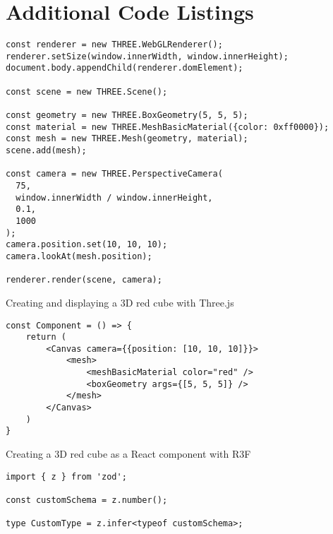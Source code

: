 \chapter{Additional Code Listings} \label{appendix-b}

\begin{listing}
\begin{verbatim}
const renderer = new THREE.WebGLRenderer();
renderer.setSize(window.innerWidth, window.innerHeight);
document.body.appendChild(renderer.domElement);

const scene = new THREE.Scene();

const geometry = new THREE.BoxGeometry(5, 5, 5);
const material = new THREE.MeshBasicMaterial({color: 0xff0000});
const mesh = new THREE.Mesh(geometry, material);
scene.add(mesh);

const camera = new THREE.PerspectiveCamera(
  75,
  window.innerWidth / window.innerHeight,
  0.1,
  1000
);
camera.position.set(10, 10, 10);
camera.lookAt(mesh.position);

renderer.render(scene, camera);
\end{verbatim}
\caption{Creating and displaying a 3D red cube with Three.js}
\label{listing:threejs}
\end{listing}

\begin{listing}
\begin{verbatim}
const Component = () => {
    return (
        <Canvas camera={{position: [10, 10, 10]}}>
            <mesh>
                <meshBasicMaterial color="red" />
                <boxGeometry args={[5, 5, 5]} />
            </mesh>
        </Canvas>
    )
}
\end{verbatim}
\caption{Creating a 3D red cube as a React component with R3F}
\label{lisiting:r3f}
\end{listing}

\begin{listing}
\begin{verbatim}
import { z } from 'zod';

const customSchema = z.number();

type CustomType = z.infer<typeof customSchema>;
\end{verbatim}
\label{listing:zod}
\end{listing}